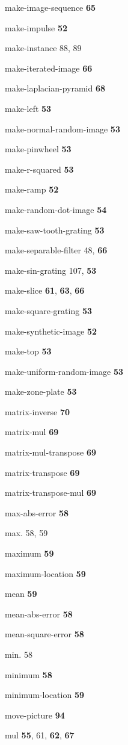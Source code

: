 \begin{theindex}
\item make-image-sequence {\bf 65}
\item make-impulse {\bf 52}
\item make-instance 88, 89
\item make-iterated-image {\bf 66}
\item make-laplacian-pyramid {\bf 68}
\item make-left {\bf 53}
\item make-normal-random-image {\bf 53}
\item make-pinwheel {\bf 53}
\item make-r-squared {\bf 53}
\item make-ramp {\bf 52}
\item make-random-dot-image {\bf 54}
\item make-saw-tooth-grating {\bf 53}
\item make-separable-filter 48, {\bf 66}
\item make-sin-grating 107, {\bf 53}
\item make-slice {\bf 61}, {\bf 63}, {\bf 66}
\item make-square-grating {\bf 53}
\item make-synthetic-image {\bf 52}
\item make-top {\bf 53}
\item make-uniform-random-image {\bf 53}
\item make-zone-plate {\bf 53}
\item matrix-inverse {\bf 70}
\item matrix-mul {\bf 69}
\item matrix-mul-transpose {\bf 69}
\item matrix-transpose {\bf 69}
\item matrix-transpose-mul {\bf 69}
\item max-abs-error {\bf 58}
\item max. 58, 59
\item maximum {\bf 59}
\item maximum-location {\bf 59}
\item mean {\bf 59}
\item mean-abs-error {\bf 58}
\item mean-square-error {\bf 58}
\item min. 58
\item minimum {\bf 58}
\item minimum-location {\bf 59}
\item move-picture {\bf 94}
\item mul {\bf 55}, 61, {\bf 62}, {\bf 67}

\end{theindex}
